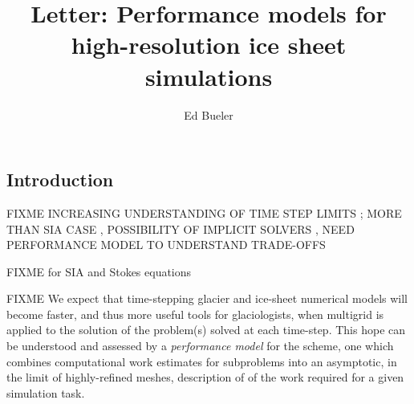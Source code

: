 \documentclass[twocolumn,letterpaper]{igs}
\begin{document}
\title[Performance models for high-resolution ice sheet simulations]{Letter: Performance models for \\ high-resolution ice sheet simulations}


\author{Ed Bueler}



\maketitle

\sectionsize

\subsection{Introduction}

FIXME INCREASING UNDERSTANDING OF TIME STEP LIMITS \citep{Chengetal2017,Robinsonetal2022}; MORE THAN SIA CASE \citep[for comparison]{HindmarshPayne1996}, POSSIBILITY OF IMPLICIT SOLVERS \citep{Bueler2016,WirbelJarosch2020}, NEED PERFORMANCE MODEL TO UNDERSTAND TRADE-OFFS

FIXME \citep{GreveBlatter2009,SchoofHewitt2013} for SIA and Stokes equations

FIXME We expect that time-stepping glacier and ice-sheet numerical models will become faster, and thus more useful tools for glaciologists, when multigrid is applied to the solution of the problem(s) solved at each time-step.  This hope can be understood and assessed by a \emph{performance model} for the scheme, one which combines computational work estimates for subproblems into an asymptotic, in the limit of highly-refined meshes, description of of the work required for a given simulation task.
\end{document}
